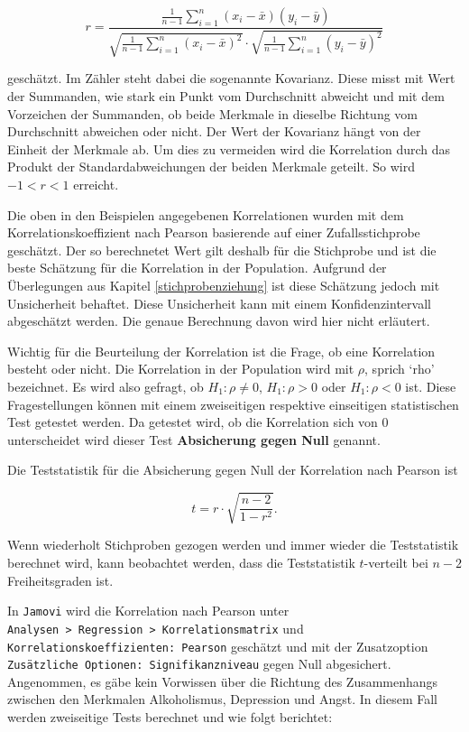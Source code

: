 \documentclass[
]{book}
\theoremstyle{definition}
\theoremstyle{definition}
\theoremstyle{definition}
\theoremstyle{definition}
\theoremstyle{remark}
\begin{document}
\[
r = \frac{\frac{1}{n-1} \sum_{i=1}^n (x_i - \bar{x})(y_i - \bar{y})}{\sqrt{\frac{1}{n-1}\sum_{i=1}^n (x_i - \bar{x})^2}\cdot \sqrt{\frac{1}{n-1}\sum_{i=1}^n (y_i - \bar{y})^2}}
\]

geschätzt. Im Zähler steht dabei die sogenannte Kovarianz. Diese misst mit Wert der Summanden, wie stark ein Punkt vom Durchschnitt abweicht und mit dem Vorzeichen der Summanden, ob beide Merkmale in dieselbe Richtung vom Durchschnitt abweichen oder nicht. Der Wert der Kovarianz hängt von der Einheit der Merkmale ab. Um dies zu vermeiden wird die Korrelation durch das Produkt der Standardabweichungen der beiden Merkmale geteilt. So wird \(-1<r<1\) erreicht.

Die oben in den Beispielen angegebenen Korrelationen wurden mit dem Korrelationskoeffizient nach Pearson basierende auf einer Zufallsstichprobe geschätzt. Der so berechnetet Wert gilt deshalb für die Stichprobe und ist die beste Schätzung für die Korrelation in der Population. Aufgrund der Überlegungen aus Kapitel \ref{stichprobenziehung} ist diese Schätzung jedoch mit Unsicherheit behaftet. Diese Unsicherheit kann mit einem Konfidenzintervall abgeschätzt werden. Die genaue Berechnung davon wird hier nicht erläutert.

Wichtig für die Beurteilung der Korrelation ist die Frage, ob eine Korrelation besteht oder nicht. Die Korrelation in der Population wird mit \(\rho\), sprich `rho' bezeichnet. Es wird also gefragt, ob \(H_1: \rho \neq 0\), \(H_1: \rho > 0\) oder \(H_1: \rho < 0\) ist. Diese Fragestellungen können mit einem zweiseitigen respektive einseitigen statistischen Test getestet werden. Da getestet wird, ob die Korrelation sich von \(0\) unterscheidet wird dieser Test \label{customdef-podukt-moment-absichern-null}{\textbf{Absicherung gegen Null}} genannt.

Die Teststatistik für die Absicherung gegen Null der Korrelation nach Pearson ist

\begin{equation}
t = r\cdot \sqrt{\frac{n-2}{1-r^2}}.
\label{eq:absichern-pearson}
\end{equation}

Wenn wiederholt Stichproben gezogen werden und immer wieder die Teststatistik berechnet wird, kann beobachtet werden, dass die Teststatistik \(t\)-verteilt bei \(n-2\) Freiheitsgraden ist.

In \texttt{Jamovi} wird die Korrelation nach Pearson unter \texttt{Analysen\ \textgreater{}\ Regression\ \textgreater{}\ Korrelationsmatrix} und \texttt{Korrelationskoeffizienten:\ Pearson} geschätzt und mit der Zusatzoption \texttt{Zusätzliche\ Optionen:\ Signifikanzniveau} gegen Null abgesichert. Angenommen, es gäbe kein Vorwissen über die Richtung des Zusammenhangs zwischen den Merkmalen Alkoholismus, Depression und Angst. In diesem Fall werden zweiseitige Tests berechnet und wie folgt berichtet:
\end{document}
